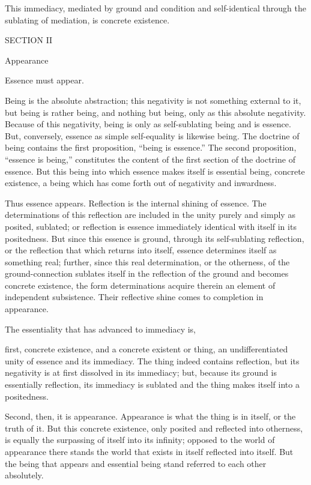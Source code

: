 This immediacy, mediated by ground and condition
and self-identical through the sublating of mediation,
is concrete existence.

SECTION II

Appearance

Essence must appear.

Being is the absolute abstraction;
this negativity is not something external to it,
but being is rather being, and nothing but being,
only as this absolute negativity.
Because of this negativity,
being is only as self-sublating being and is essence.
But, conversely, essence as simple self-equality is likewise being.
The doctrine of being contains the first proposition,
“being is essence.”
The second proposition, “essence is being,”
constitutes the content of the first section of the doctrine of essence.
But this being into which essence makes itself is essential being,
concrete existence, a being which has
come forth out of negativity and inwardness.

Thus essence appears.
Reflection is the internal shining of essence.
The determinations of this reflection are included
in the unity purely and simply as posited, sublated;
or reflection is essence immediately identical
with itself in its positedness.
But since this essence is ground, through its self-sublating reflection,
or the reflection that which returns into itself,
essence determines itself as something real;
further, since this real determination,
or the otherness, of the ground-connection sublates itself
in the reflection of the ground and becomes concrete existence,
the form determinations acquire therein an element of independent subsistence.
Their reflective shine comes to completion in appearance.

The essentiality that has advanced to immediacy is,

first, concrete existence, and a concrete existent or thing,
an undifferentiated unity of essence and its immediacy.
The thing indeed contains reflection, but its negativity is
at first dissolved in its immediacy;
but, because its ground is essentially reflection,
its immediacy is sublated
and the thing makes itself into a positedness.

Second, then, it is appearance.
Appearance is what the thing is in itself,
or the truth of it.
But this concrete existence,
only posited and reflected into otherness,
is equally the surpassing of itself into its infinity;
opposed to the world of appearance there stands
the world that exists in itself reflected into itself.
But the being that appears and essential being
stand referred to each other absolutely.

